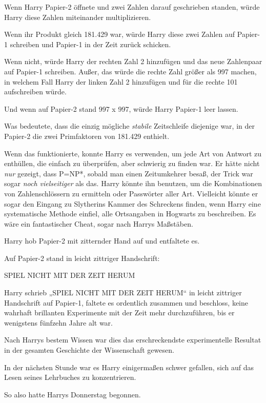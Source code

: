{Wenn Harry Papier-2 öffnete und zwei Zahlen darauf geschrieben standen, würde Harry diese Zahlen miteinander multiplizieren.

Wenn ihr Produkt gleich 181.429 war, würde Harry diese zwei Zahlen auf Papier-1 schreiben und Papier-1 in der Zeit zurück schicken.

Wenn nicht, würde Harry der rechten Zahl 2 hinzufügen und das neue Zahlenpaar auf Papier-1 schreiben. Außer, das würde die rechte Zahl größer als 997 machen, in welchem Fall Harry der linken Zahl 2 hinzufügen und für die rechte 101 aufschreiben würde.

Und wenn auf Papier-2 stand 997 x 997, würde Harry Papier-1 leer lassen.

Was bedeutete, dass die einzig mögliche \emph{stabile} Zeitschleife diejenige war, in der Papier-2 die zwei Primfaktoren von 181.429 enthielt.

Wenn das funktionierte, konnte Harry es verwenden, um jede Art von Antwort zu enthüllen, die einfach zu überprüfen, aber schwierig zu finden war. Er hätte nicht \emph{nur} gezeigt, dass P=NP*, sobald man einen Zeitumkehrer besaß, der Trick war sogar \emph{noch vielseitiger} als das. Harry könnte ihn benutzen, um die Kombinationen von Zahlenschlössern zu ermitteln oder Passwörter aller Art. Vielleicht könnte er sogar den Eingang zu Slytherins Kammer des Schreckens finden, wenn Harry eine systematische Methode einfiel, alle Ortsangaben in Hogwarts zu beschreiben. Es wäre ein fantastischer Cheat, sogar nach Harrys Maßstäben.

Harry hob Papier-2 mit zitternder Hand auf und entfaltete es.

Auf Papier-2 stand in leicht zittriger Handschrift:

SPIEL NICHT MIT DER ZEIT HERUM

Harry schrieb „SPIEL NICHT MIT DER ZEIT HERUM“ in leicht zittriger Handschrift auf Papier-1, faltete es ordentlich zusammen und beschloss, keine wahrhaft brillanten Experimente mit der Zeit mehr durchzuführen, bis er wenigstens fünfzehn Jahre alt war.

Nach Harrys bestem Wissen war dies das erschreckendste experimentelle Resultat in der gesamten Geschichte der Wissenschaft gewesen.

In der nächsten Stunde war es Harry einigermaßen schwer gefallen, sich auf das Lesen seines Lehrbuches zu konzentrieren.

So also hatte Harrys Donnerstag begonnen.

\later

}
